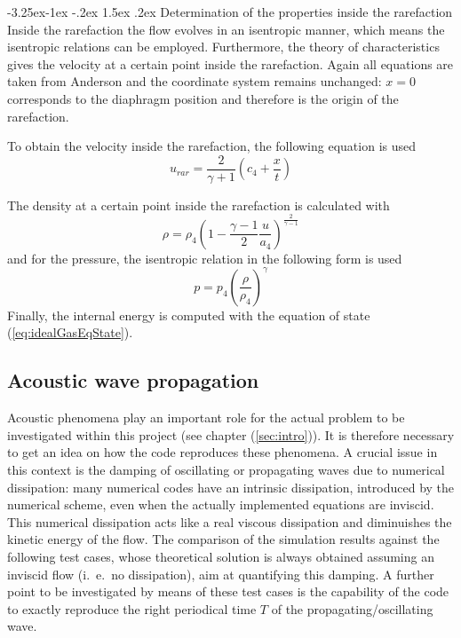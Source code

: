 \documentclass{report}
\makeatletter
\renewcommand\paragraph{\@startsection{paragraph}{4}{\z@}%
  {-3.25ex\@plus -1ex \@minus -.2ex}%
  {1.5ex \@plus .2ex}%
  {\normalfont\normalsize\bfseries}}
\makeatother
\begin{document}
\paragraph{Determination of the properties inside the rarefaction}
Inside the rarefaction the flow evolves in an isentropic manner, which means the isentropic relations can be employed. Furthermore, the theory of characteristics gives the velocity at a certain point inside the rarefaction. Again all equations are taken from Anderson \cite{Anderson2002} and the coordinate system remains unchanged: $x=0$ corresponds to the diaphragm position and therefore is the origin of the rarefaction.

To obtain the velocity inside the rarefaction, the following equation is used
\begin{equation}
 u_{rar}=\frac{2}{\gamma+1}\left(c_4+\frac{x}{t}\right)
\end{equation}

The density at a certain point inside the rarefaction is calculated with
\begin{equation}
\rho=\rho_4 \left(1-\frac{\gamma-1}{2}\frac{u}{a_4}\right)^\frac{2}{\gamma-1}
\end{equation}
and for the pressure, the isentropic relation in the following form is used
\begin{equation}
p=p_4\left(\frac{\rho}{\rho_4}\right)^\gamma
\end{equation}
Finally, the internal energy is computed with the equation of state (\ref{eq:idealGasEqState}).

\subsection{Acoustic wave propagation}
\label{sec:AcousticWavePropagation_GenIntro}
Acoustic phenomena play an important role for the actual problem to be investigated within this project (see chapter (\ref{sec:intro})). It is therefore necessary to get an idea on how the code reproduces these phenomena. A crucial issue in this context is the damping of oscillating or propagating waves due to numerical dissipation: many numerical codes have an intrinsic dissipation, introduced by the numerical scheme, even when the actually implemented equations are inviscid. This numerical dissipation acts like a real viscous dissipation and diminuishes the kinetic energy of the flow. The comparison of the simulation results against the following test cases, whose theoretical solution is always obtained assuming an inviscid flow (i.\ e.\ no dissipation), aim at quantifying this damping. A further point to be investigated by means of these test cases is the capability of the code to exactly reproduce the right periodical time $T$ of the propagating/oscillating wave.
 
\end{document}
